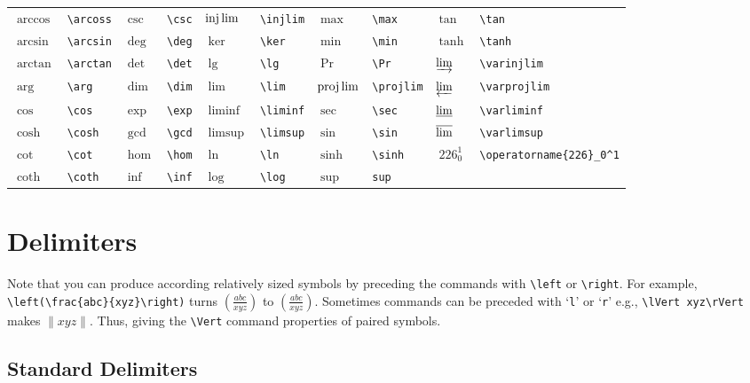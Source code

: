 \documentclass[10pt, english]{article}
\begin{document}
	\begin{center}
		\scriptsize
	\begin{tabular}{ll|ll|ll|ll|ll}
		$\arccos$ & \verb|\arcoss| & $\csc$ & \verb|\csc| & $\injlim$ & \verb|\injlim| & $\max$ & \verb|\max| & $\tan$ & \verb|\tan| \\
		$\arcsin$ & \verb|\arcsin| & $\deg$ & \verb|\deg| & $\ker$ & \verb|\ker| & $\min$ & \verb|\min| & $\tanh$ & \verb|\tanh| \\
		$\arctan$ & \verb|\arctan| & $\det$ & \verb|\det| & $\lg$ & \verb|\lg| & $\Pr$ & \verb|\Pr| & $\varinjlim$ & \verb|\varinjlim| \\
		$\arg$ & \verb|\arg| & $\dim$ & \verb|\dim| & $\lim$ & \verb|\lim| & $\projlim$ & \verb|\projlim| & $\varprojlim$ & \verb|\varprojlim| \\
		$\cos$ & \verb|\cos| & $\exp$ & \verb|\exp| & $\liminf$ & \verb|\liminf| & $\sec$ & \verb|\sec| & $\varliminf$ & \verb|\varliminf| \\
		$\cosh$ & \verb|\cosh| & $\gcd$ & \verb|\gcd| & $\limsup$ & \verb|\limsup| & $\sin$ & \verb|\sin| & $\varlimsup$ & \verb|\varlimsup| \\
		$\cot$ & \verb|\cot| & $\hom$ & \verb|\hom| & $\ln$ & \verb|\ln| & $\sinh$ & \verb|\sinh| & $\operatorname{226}_0^1$ & \verb|\operatorname{226}_0^1| \\
		$\coth$ & \verb|\coth| & $\inf$ & \verb|\inf| & $\log$ & \verb|\log| & $\sup$ & \verb|sup| \\ 
	\end{tabular}
	\end{center}

\section{Delimiters}

	Note that you can produce according relatively sized symbols by preceding the commands with \verb|\left| or \verb|\right|. For example, \verb|\left(\frac{abc}{xyz}\right)| turns $(\frac{abc}{xyz})$ to $\left(\frac{abc}{xyz}\right)$. Sometimes commands can be preceded with  `\verb|l|' or `\verb|r|' e.g., \verb|\lVert xyz\rVert| makes $\lVert xyz\rVert$. Thus, giving the \verb|\Vert| command properties of paired symbols.

	\subsection{Standard Delimiters}
\end{document}
